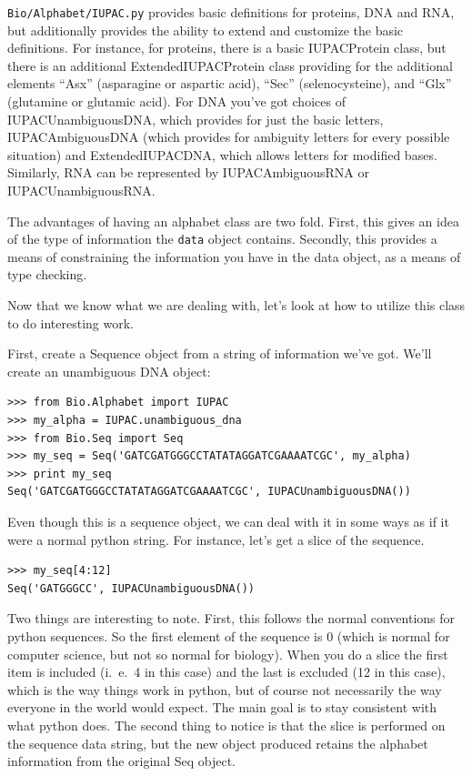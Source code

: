 \documentclass{report}
\begin{document}
\verb|Bio/Alphabet/IUPAC.py| provides basic definitions for proteins, DNA and RNA, but additionally provides the ability to extend and customize the basic definitions. For instance, for proteins, there is a basic IUPACProtein class, but there is an additional ExtendedIUPACProtein class providing for the additional elements ``Asx'' (asparagine or aspartic acid), ``Sec'' (selenocysteine), and ``Glx'' (glutamine or glutamic acid). For DNA you've got choices of IUPACUnambiguousDNA, which provides for just the basic letters, IUPACAmbiguousDNA (which provides for ambiguity letters for every possible situation) and ExtendedIUPACDNA, which allows letters for modified bases. Similarly, RNA can be represented by IUPACAmbiguousRNA or IUPACUnambiguousRNA.

The advantages of having an alphabet class are two fold. First, this gives an idea of the type of information the \verb|data| object contains. Secondly, this provides a means of constraining the information you have in the data object, as a means of type checking.

Now that we know what we are dealing with, let's look at how to utilize this class to do interesting work.

First, create a Sequence object from a string of information we've got. We'll create an unambiguous DNA object:

\begin{verbatim}
>>> from Bio.Alphabet import IUPAC
>>> my_alpha = IUPAC.unambiguous_dna
>>> from Bio.Seq import Seq
>>> my_seq = Seq('GATCGATGGGCCTATATAGGATCGAAAATCGC', my_alpha)
>>> print my_seq
Seq('GATCGATGGGCCTATATAGGATCGAAAATCGC', IUPACUnambiguousDNA())
\end{verbatim}


Even though this is a sequence object, we can deal with it in some ways as if it were a normal python string. For instance, let's get a slice of the sequence.

\begin{verbatim}
>>> my_seq[4:12]
Seq('GATGGGCC', IUPACUnambiguousDNA())
\end{verbatim}

Two things are interesting to note. First, this follows the normal conventions for python sequences.  So the first element of the sequence is 0 (which is normal for computer science, but not so normal for biology). When you do a slice the first item is included (i.~e.~4 in this case) and the last is excluded (12 in this case), which is the way things work in python, but of course not necessarily the way everyone in the world would expect. The main goal is to stay consistent with what python does. The second thing to notice is that the slice is performed on the sequence data string, but the new object produced retains the alphabet information from the original Seq object.
\end{document}
